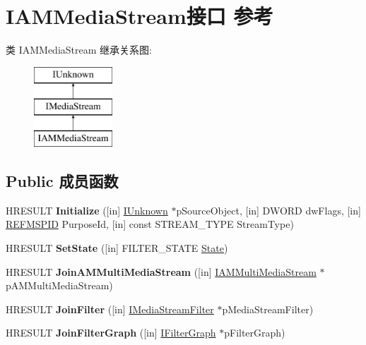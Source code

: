 \hypertarget{interface_i_a_m_media_stream}{}\section{I\+A\+M\+Media\+Stream接口 参考}
\label{interface_i_a_m_media_stream}
类 I\+A\+M\+Media\+Stream 继承关系图\+:\begin{figure}[H]
\begin{center}
\leavevmode
\includegraphics[height=3.000000cm]{interface_i_a_m_media_stream}
\end{center}
\end{figure}
\subsection*{Public 成员函数}
\begin{DoxyCompactItemize}
\item 
\mbox{\label{interface_i_a_m_media_stream_aa0efd62d37b3d00567eabb707d11e6d5}} 
H\+R\+E\+S\+U\+LT {\bfseries Initialize} (\mbox{[}in\mbox{]} \hyperlink{interface_i_unknown}{I\+Unknown} $\ast$p\+Source\+Object, \mbox{[}in\mbox{]} D\+W\+O\+RD dw\+Flags, \mbox{[}in\mbox{]} \hyperlink{struct___g_u_i_d}{R\+E\+F\+M\+S\+P\+ID} Purpose\+Id, \mbox{[}in\mbox{]} const S\+T\+R\+E\+A\+M\+\_\+\+T\+Y\+PE Stream\+Type)
\item 
\mbox{\label{interface_i_a_m_media_stream_ad834b3c8347346130e39c7d159c8c51b}} 
H\+R\+E\+S\+U\+LT {\bfseries Set\+State} (\mbox{[}in\mbox{]} F\+I\+L\+T\+E\+R\+\_\+\+S\+T\+A\+TE \hyperlink{struct_state}{State})
\item 
\mbox{\label{interface_i_a_m_media_stream_a92c0b6bed0a9318142b5cc8b4a552b93}} 
H\+R\+E\+S\+U\+LT {\bfseries Join\+A\+M\+Multi\+Media\+Stream} (\mbox{[}in\mbox{]} \hyperlink{interface_i_a_m_multi_media_stream}{I\+A\+M\+Multi\+Media\+Stream} $\ast$p\+A\+M\+Multi\+Media\+Stream)
\item 
\mbox{\label{interface_i_a_m_media_stream_a73b6e786e2b25fe213d6d404ab04b9ac}} 
H\+R\+E\+S\+U\+LT {\bfseries Join\+Filter} (\mbox{[}in\mbox{]} \hyperlink{interface_i_media_stream_filter}{I\+Media\+Stream\+Filter} $\ast$p\+Media\+Stream\+Filter)
\item 
\mbox{\label{interface_i_a_m_media_stream_aaed3df79c75b58dcc471abc990427681}} 
H\+R\+E\+S\+U\+LT {\bfseries Join\+Filter\+Graph} (\mbox{[}in\mbox{]} \hyperlink{interface_i_filter_graph}{I\+Filter\+Graph} $\ast$p\+Filter\+Graph)
\end{DoxyCompactItemize}
